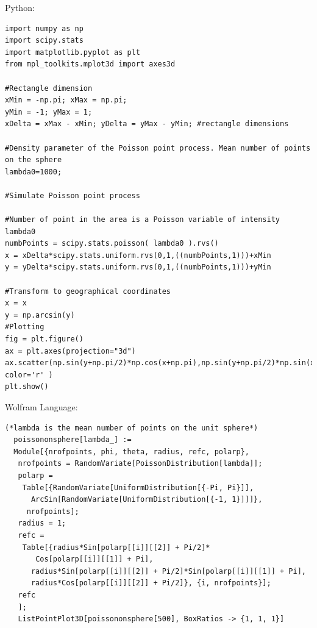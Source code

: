 \documentclass{article}
\begin{document}
Python:

\begin{verbatim}
import numpy as np
import scipy.stats
import matplotlib.pyplot as plt
from mpl_toolkits.mplot3d import axes3d

#Rectangle dimension
xMin = -np.pi; xMax = np.pi;
yMin = -1; yMax = 1;
xDelta = xMax - xMin; yDelta = yMax - yMin; #rectangle dimensions

#Density parameter of the Poisson point process. Mean number of points on the sphere
lambda0=1000; 

#Simulate Poisson point process

#Number of point in the area is a Poisson variable of intensity lambda0
numbPoints = scipy.stats.poisson( lambda0 ).rvs()
x = xDelta*scipy.stats.uniform.rvs(0,1,((numbPoints,1)))+xMin
y = yDelta*scipy.stats.uniform.rvs(0,1,((numbPoints,1)))+yMin

#Transform to geographical coordinates
x = x
y = np.arcsin(y)
#Plotting
fig = plt.figure()
ax = plt.axes(projection="3d")
ax.scatter(np.sin(y+np.pi/2)*np.cos(x+np.pi),np.sin(y+np.pi/2)*np.sin(x+np.pi),np.cos(y+np.pi/2), color='r' )
plt.show()

\end{verbatim}

Wolfram Language:
\begin{verbatim}
(*lambda is the mean number of points on the unit sphere*) 
  poissononsphere[lambda_] := 
  Module[{nrofpoints, phi, theta, radius, refc, polarp}, 
   nrofpoints = RandomVariate[PoissonDistribution[lambda]];
   polarp = 
    Table[{RandomVariate[UniformDistribution[{-Pi, Pi}]], 
      ArcSin[RandomVariate[UniformDistribution[{-1, 1}]]]}, 
     nrofpoints];
   radius = 1;
   refc = 
    Table[{radius*Sin[polarp[[i]][[2]] + Pi/2]*
       Cos[polarp[[i]][[1]] + Pi],
      radius*Sin[polarp[[i]][[2]] + Pi/2]*Sin[polarp[[i]][[1]] + Pi],
      radius*Cos[polarp[[i]][[2]] + Pi/2]}, {i, nrofpoints}];
   refc
   ];
   ListPointPlot3D[poissononsphere[500], BoxRatios -> {1, 1, 1}]  
\end{verbatim}
\end{document}
